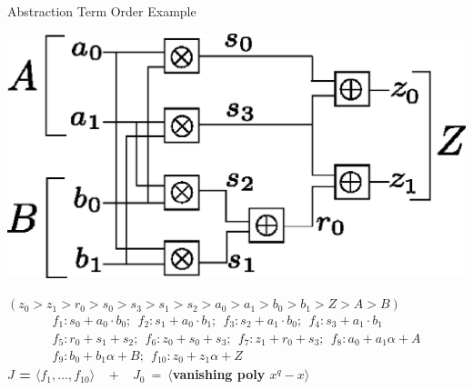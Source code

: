 \documentclass[xcolor=dvipsnames]{beamer}
\begin{document}
\begin{frame}{\large{Abstraction Term Order Example}}

\centerline{
\includegraphics[scale=0.4]{2bitmult.eps}
}
{\bf $(z_0 > z_1 > r_0 > s_0 > s_3 > s_1 > s_2 > a_0 > a_1 >  b_0 > b_1 > Z > A > B)$}
\begin{align*}
f_1: s_0+a_0 \cdot b_0; ~~f_2: s_1+a_0 \cdot b_1;  ~~f_3: s_2+a_1 \cdot b_0; ~~f_4: s_3+a_1 \cdot b_1  \nonumber \\
f_5: r_0+s_1 + s_2; ~~f_6: z_0+s_0 + s_3; ~~f_7: z_1+r_0+s_3; ~~f_8: a_0 + a_1 \alpha + A \nonumber \\ 
f_9: b_0 + b_1 \alpha + B; ~~f_{10}: z_0 + z_1 \alpha + Z \nonumber
\end{align*}
\vspace{-0.3in}
{\bf $J$ = $\langle f_1, \dots, f_{10} \rangle\ \ \ \ +\ \ \ \ J_0\ =\ \langle$vanishing poly $x^q-x\rangle$}
\end{frame}


\end{document}

